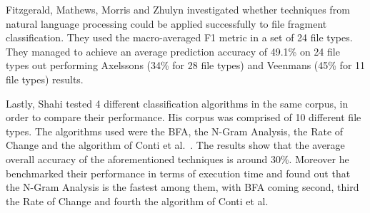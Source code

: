 
Fitzgerald, Mathews, Morris and Zhulyn\cite{Fitz} investigated whether techniques from natural language processing could be applied successfully to file fragment classification. They used the macro-averaged F1 metric in a set of 24 file types. They managed to achieve an average prediction accuracy of 49.1\% on 24 file types out performing Axelssons (34\% for 28 file types) and Veenmans (45\% for 11 file types) results.

Lastly, Shahi\cite{Ashim} tested 4 different classification algorithms in the same corpus, in order to compare their performance. His corpus was comprised of 10 different file types. The algorithms used were the BFA\cite{MacDaniel}, the N-Gram Analysis\cite{ngram}, the Rate of Change\cite{roc} and the algorithm of Conti et al.~\cite{Conti}. The results show that the average overall accuracy of the aforementioned techniques is around 30\%. Moreover he benchmarked their performance in terms of execution time and found out that the N-Gram Analysis is the fastest among them, with BFA coming second, third the Rate of Change and fourth the algorithm of Conti et al.




